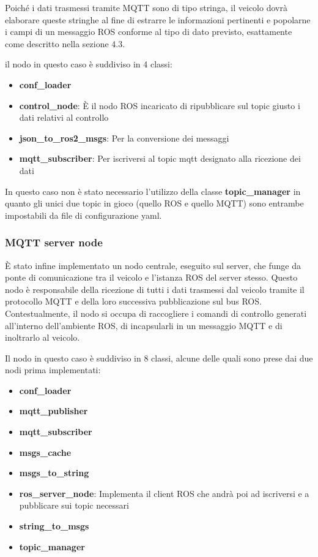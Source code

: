 \noindent Poiché i dati trasmessi tramite MQTT sono di tipo stringa, il veicolo dovrà elaborare queste stringhe al fine di estrarre le informazioni pertinenti e popolarne i campi di un messaggio ROS conforme al tipo di dato previsto, esattamente come descritto nella sezione 4.3.

\noindent il nodo in questo caso è suddiviso in 4 classi: 

\begin{itemize}
  \item \textbf{conf\_loader}
  \item \textbf{control\_node}: È il nodo ROS incaricato di ripubblicare sul topic giusto i dati relativi al controllo
  \item \textbf{json\_to\_ros2\_msgs}: Per la conversione dei messaggi
  \item \textbf{mqtt\_subscriber}: Per iscriversi al topic mqtt designato alla ricezione dei dati
\end{itemize}

\noindent In questo caso non è stato necessario l'utilizzo della classe \textbf{topic\_manager} in quanto gli unici due topic in gioco (quello ROS e quello MQTT) sono entrambe impostabili da file di configurazione yaml.

\subsubsection{MQTT server node}
È stato infine implementato un nodo centrale, eseguito sul server, che funge da ponte di comunicazione tra il veicolo e l'istanza ROS del server stesso. Questo nodo è responsabile della ricezione di tutti i dati trasmessi dal veicolo tramite il protocollo MQTT e della loro successiva pubblicazione sul bus ROS. Contestualmente, il nodo si occupa di raccogliere i comandi di controllo generati all'interno dell'ambiente ROS, di incapsularli in un messaggio MQTT e di inoltrarlo al veicolo.

\noindent Il nodo in questo caso è suddiviso in 8 classi, alcune delle quali sono prese dai due nodi prima implementati:

\begin{itemize}
  \item \textbf{conf\_loader}
  \item \textbf{mqtt\_publisher}
  \item \textbf{mqtt\_subscriber}
  \item \textbf{msgs\_cache}
  \item \textbf{msgs\_to\_string}
  \item \textbf{ros\_server\_node}: Implementa il client ROS che andrà poi ad iscriversi e a pubblicare sui topic necessari
  \item \textbf{string\_to\_msgs}
  \item \textbf{topic\_manager}
\end{itemize}

